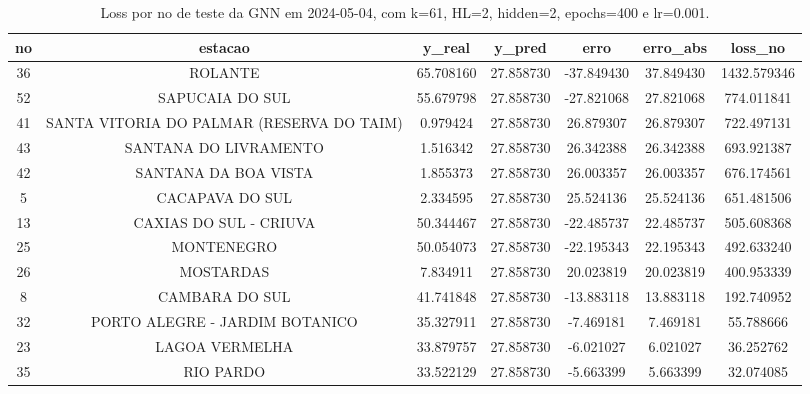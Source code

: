 \begin{table}[h]
\centering
\caption{Loss por no de teste da GNN em 2024-05-04, com k=61, HL=2, hidden=2, epochs=400 e lr=0.001.}
\label{tab:gnn_loss_k61_hl2_h2_e400_d20240504}
\begin{tabular}{ccccccc}
\toprule
no & estacao & y\_real & y\_pred & erro & erro\_abs & loss\_no \\
\midrule
36 & ROLANTE & 65.708160 & 27.858730 & -37.849430 & 37.849430 & 1432.579346 \\
52 & SAPUCAIA DO SUL & 55.679798 & 27.858730 & -27.821068 & 27.821068 & 774.011841 \\
41 & SANTA VITORIA DO PALMAR (RESERVA DO TAIM) & 0.979424 & 27.858730 & 26.879307 & 26.879307 & 722.497131 \\
43 & SANTANA DO LIVRAMENTO & 1.516342 & 27.858730 & 26.342388 & 26.342388 & 693.921387 \\
42 & SANTANA DA BOA VISTA & 1.855373 & 27.858730 & 26.003357 & 26.003357 & 676.174561 \\
5 & CACAPAVA DO SUL & 2.334595 & 27.858730 & 25.524136 & 25.524136 & 651.481506 \\
13 & CAXIAS DO SUL - CRIUVA & 50.344467 & 27.858730 & -22.485737 & 22.485737 & 505.608368 \\
25 & MONTENEGRO & 50.054073 & 27.858730 & -22.195343 & 22.195343 & 492.633240 \\
26 & MOSTARDAS & 7.834911 & 27.858730 & 20.023819 & 20.023819 & 400.953339 \\
8 & CAMBARA DO SUL & 41.741848 & 27.858730 & -13.883118 & 13.883118 & 192.740952 \\
32 & PORTO ALEGRE - JARDIM BOTANICO & 35.327911 & 27.858730 & -7.469181 & 7.469181 & 55.788666 \\
23 & LAGOA VERMELHA & 33.879757 & 27.858730 & -6.021027 & 6.021027 & 36.252762 \\
35 & RIO PARDO & 33.522129 & 27.858730 & -5.663399 & 5.663399 & 32.074085 \\
\bottomrule
\end{tabular}
\end{table}
